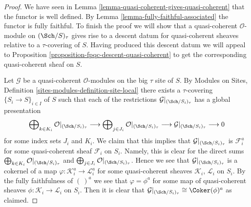 \begin{proof}
We have seen in Lemma \ref{lemma-quasi-coherent-gives-quasi-coherent}
that the functor is well defined. By Lemma \ref{lemma-fully-faithful-associated}
the functor is fully faithful. To finish the proof we will show that a
quasi-coherent $\mathcal{O}$-module on $(\Sch/S)_\tau$ gives
rise to a descent datum for quasi-coherent sheaves relative to a
$\tau$-covering of $S$. Having produced this descent datum we will appeal
to Proposition \ref{proposition-fpqc-descent-quasi-coherent} to get the
corresponding quasi-coherent sheaf on $S$.

\medskip\noindent
Let $\mathcal{G}$ be a quasi-coherent $\mathcal{O}$-modules on
the big $\tau$ site of $S$. By
Modules on Sites, Definition \ref{sites-modules-definition-site-local}
there exists a $\tau$-covering $\{S_i \to S\}_{i \in I}$ of $S$
such that each of the restrictions
$\mathcal{G}|_{(\Sch/S_i)_\tau}$ has a global presentation
$$
\bigoplus\nolimits_{k \in K_i} \mathcal{O}|_{(\Sch/S_i)_\tau}
\longrightarrow
\bigoplus\nolimits_{j \in J_i} \mathcal{O}|_{(\Sch/S_i)_\tau}
\longrightarrow
\mathcal{G}|_{(\Sch/S_i)_\tau} \longrightarrow 0
$$
for some index sets $J_i$ and $K_i$. We claim that this implies
that $\mathcal{G}|_{(\Sch/S_i)_\tau}$ is $\mathcal{F}_i^a$
for some quasi-coherent sheaf $\mathcal{F}_i$ on $S_i$. Namely,
this is clear for the direct sums
$\bigoplus\nolimits_{k \in K_i} \mathcal{O}|_{(\Sch/S_i)_\tau}$
and
$\bigoplus\nolimits_{j \in J_i} \mathcal{O}|_{(\Sch/S_i)_\tau}$.
Hence we see that $\mathcal{G}|_{(\Sch/S_i)_\tau}$ is a
cokernel of a map $\varphi : \mathcal{K}_i^a \to \mathcal{L}_i^a$
for some quasi-coherent sheaves $\mathcal{K}_i$, $\mathcal{L}_i$
on $S_i$. By the fully faithfulness of $(\ )^a$ we see that
$\varphi = \phi^a$ for some map of quasi-coherent sheaves
$\phi : \mathcal{K}_i \to \mathcal{L}_i$ on $S_i$. Then it is
clear that
$\mathcal{G}|_{(\Sch/S_i)_\tau} \cong \Coker(\phi)^a$
as claimed.


\end{proof}
